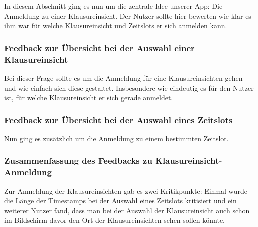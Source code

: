         In diesem Abschnitt ging es nun um die zentrale Idee unserer App: Die Anmeldung zu einer Klausureinsicht. Der Nutzer sollte hier bewerten wie klar es ihm war für welche Klausureinsicht und Zeitslots er sich anmelden kann.

        \subsubsection{Feedback zur Übersicht bei der Auswahl einer Klausureinsicht}

            Bei dieser Frage sollte es um die Anmeldung für eine Klausureinsichten gehen und wie einfach sich diese gestaltet. Insbesondere wie eindeutig es für den Nutzer ist, für welche Klausureinsicht er sich gerade anmeldet.

            \begin{bchart} [min = 0, max = 10, step = 2]
                \bigskip
                \bigskip
                \bigskip
                \bigskip
            \end{bchart}

        \subsubsection{Feedback zur Übersicht bei der Auswahl eines Zeitslots}

            Nun ging es zusätzlich um die Anmeldung zu einem bestimmten Zeitslot.

            \begin{bchart} [min = 0, max = 10, step = 2]
                \bigskip
                \bigskip
                \bigskip
                \bigskip
            \end{bchart}

        \subsubsection{Zusammenfassung des Feedbacks zu Klausureinsicht-Anmeldung}

            Zur Anmeldung der Klausureinsichten gab es zwei Kritikpunkte: Einmal wurde die Länge der Timestamps bei der Auswahl eines Zeitslots kritisiert und ein weiterer Nutzer fand, dass man bei der Auswahl der Klausureinsicht auch schon im Bildschirm davor den Ort der Klausureinsichten sehen sollen könnte.

